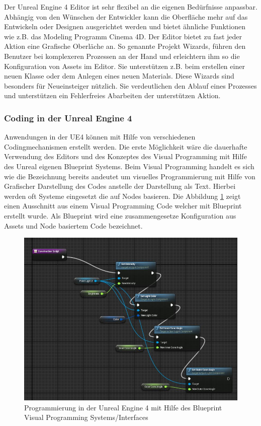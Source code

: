 \documentclass[pagesize, paper=a4, fontsize=12pt, titlepage=true, headings=small, headnosepline, abstractoff, liststotoc, nochapterprefix, plainheadsepline, twoside]{scrreprt}
\begin{document}
Der Unreal Engine 4 Editor ist sehr flexibel an die eigenen Bedürfnisse anpassbar. Abhängig von den Wünschen der Entwickler kann die Oberfläche mehr auf das Entwickeln oder Designen ausgerichtet werden und bietet ähnliche Funktionen wie z.B. das Modeling Programm Cinema 4D. Der Editor bietet zu fast jeder Aktion eine Grafische Oberläche an. So genannte Projekt Wizards, führen den Benutzer bei komplexeren Prozessen an der Hand und erleichtern ihm so die Konfiguration von Assets im Editor. Sie unterstützen z.B. beim erstellen einer neuen Klasse oder dem Anlegen eines neuen Materials. Diese Wizards sind besonders für Neueinsteiger nützlich. Sie verdeutlichen den Ablauf eines Prozesses und unterstützen ein Fehlerfreies Abarbeiten der unterstützen Aktion.

\subsubsection{Coding in der Unreal Engine 4}
Anwendungen in der UE4 können mit Hilfe von verschiedenen Codingmechanismen erstellt werden. Die erste Möglichkeit wäre die dauerhafte Verwendung des Editors und des Konzeptes des Visual Programming mit Hilfe des Unreal eigenen Blueprint Systems. Beim Visual Programming handelt es sich wie die Bezeichnung bereits andeutet um visuelles Programmierung mit Hilfe von Grafischer Darstellung des Codes anstelle der Darstellung als Text. Hierbei werden oft Systeme eingesetzt die auf Nodes basieren. Die Abbildung \ref{UE4Blueprint} zeigt einen Ausschnitt aus einem Visual Programming Code welcher mit Blueprint erstellt wurde. Als Blueprint wird eine zusammengesetze Konfiguration aus Assets und Node basiertem Code bezeichnet.

\begin{figure}[ht]
	\centering
	\includegraphics[width=\linewidth]{Bilder/ue4Blueprint.jpg}
	\caption{Programmierung in der Unreal Engine 4 mit Hilfe des Blueprint Visual Programming Systems/Interfaces}
	\label{UE4Blueprint}	
\end{figure} 
\end{document}
